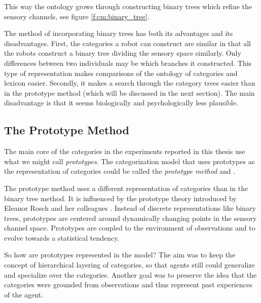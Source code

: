 This way the ontology grows through constructing binary trees which refine the sensory channels, see figure \ref{f:cm:binary_tree}.

The method of incorporating binary trees has both its advantages and its disadvantages. First, the categories a robot can construct are similar in that all the robots construct a binary tree dividing the sensory space similarly. Only differences between two individuals may be which branches it constructed. This type of representation makes comparisons of the ontology of categories and lexicon easier. Secondly, it makes a search through the category trees easier than in the prototype method (which will be discussed in the next section). The main disadvantage is that it seems biologically and psychologically less plausible.


\subsection{The Prototype Method}\label{s:cm:proto}

The main core of the categories in the experiments reported in this thesis use what we might call {\em prototypes}. The categorization model that uses prototypes as the representation of categories could be called the {\em prototype method} \cite{dejongvogt:1998} and \cite{vogt:1998c}.

The prototype method uses a different representation of categories than in the binary tree method. It is influenced by the prototype theory introduced by Eleanor Rosch and her colleagues \cite{rosch:1976}. Instead of discrete representations like binary trees, prototypes are centered around dynamically changing points in the sensory channel space. Prototypes are coupled to the environment of observations and to evolve towards a statistical tendency.

So how are prototypes represented in the model? The aim was to keep the concept of hierarchical layering of categories, so that agents still could generalize and specialize over the categories. Another goal was to preserve the idea that the categories were grounded from observations and thus represent past experiences of the agent. 

